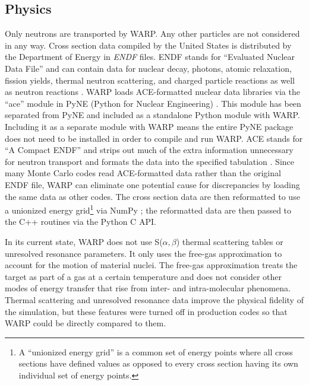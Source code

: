 \documentclass[preprint,12pt]{elsarticle}
\begin{document}
\subsection{Physics}

Only neutrons are transported by WARP.  Any other particles are not considered in any way.  Cross section data compiled by the United States is distributed by the Department of Energy in \emph{ENDF} files.  ENDF stands for ``Evaluated Nuclear Data File'' and can contain data for nuclear decay, photons, atomic relaxation, fission yields, thermal neutron scattering, and charged particle reactions as well as neutron reactions \cite{endf71,endfnums}.   WARP loads ACE-formatted nuclear data libraries via the ``ace'' module in PyNE (Python for Nuclear Engineering) \cite{pyne}.  This module has been separated from PyNE and included as a standalone Python module with WARP.  Including it as a separate module with WARP means the entire PyNE package does not need to be installed in order to compile and run WARP.  ACE stands for ``A Compact ENDF'' and strips out much of the extra information unnecessary for neutron transport and formats the data into the specified tabulation \cite{endfnums}.  Since many Monte Carlo codes read ACE-formatted data rather than the original ENDF file, WARP can eliminate one potential cause for discrepancies by loading the same data as other codes.  The cross section data are then reformatted to use a unionized energy grid\footnote{A ``unionized energy grid'' is a common set of energy points where all cross sections have defined values as opposed to every cross section having its own individual set of energy points.} via NumPy \cite{numpy}; the reformatted data are then passed to the C++ routines via the Python C API.

In its current state, WARP does not use S($\alpha,\beta$) thermal scattering tables or unresolved resonance parameters.  It only uses the free-gas approximation to account for the motion of material nuclei.  The free-gas approximation treats the target as part of a gas at a certain temperature and does not consider other modes of energy transfer that rise from inter- and intra-molecular phenomena.  Thermal scattering and unresolved resonance data improve the physical fidelity of the simulation, but these features were turned off in production codes so that WARP could be directly compared to them. 
\end{document}
